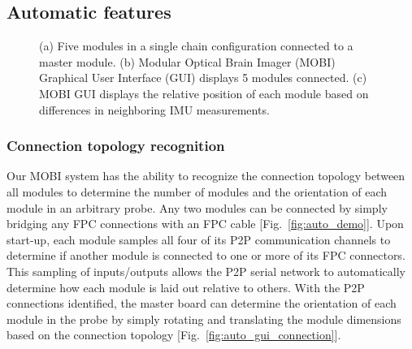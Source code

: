 \subsection{Automatic features}
\begin{figure}
    \begin{center}
    \end{center}
    \caption{(a) Five modules in a single chain configuration connected to a master module. (b) Modular Optical Brain Imager (MOBI) Graphical User Interface (GUI) displays 5 modules connected. (c) MOBI GUI displays the relative position of each module based on differences in neighboring IMU measurements.} 
    \label{fig:automatic}
\end{figure} 
\subsubsection{Connection topology recognition}
Our \ac{MOBI} system has the ability to recognize the connection topology between all modules to determine the number of modules and the orientation of each module in an arbitrary probe. Any two modules can be connected by simply bridging any FPC connections with an FPC cable [Fig.~\ref{fig:auto_demo}]. Upon start-up, each module samples all four of its \ac{P2P} communication channels to determine if another module is connected to one or more of its FPC connectors. This sampling of inputs/outputs allows the \ac{P2P} serial network to automatically determine how each module is laid out relative to others. With the \ac{P2P} connections identified, the master board can determine the orientation of each module in the probe by simply rotating and translating the module dimensions based on the connection topology [Fig.~\ref{fig:auto_gui_connection}]. 

